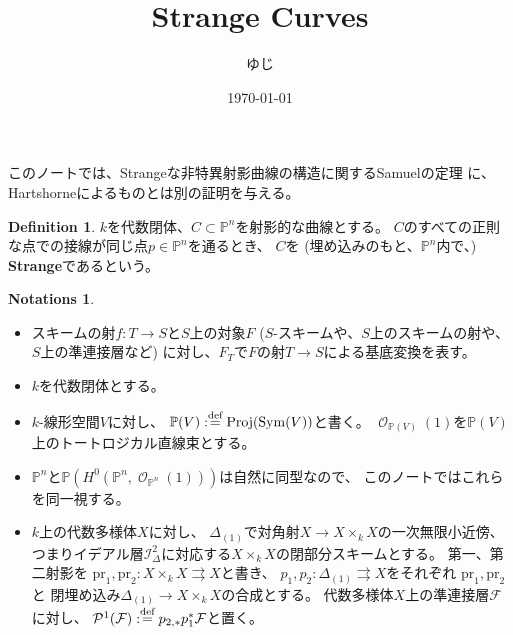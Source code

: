 \documentclass[uplatex]{jsarticle}
\title{Strange Curves}
\author{ゆじ}
\date{\today}
\theoremstyle{definition}
\newtheorem{defi}[defi]{Definition}
\newtheorem*{notation*}{Notations}
\DeclareMathOperator{\Proj}{\mathrm{Proj}}
\DeclareMathOperator{\Sym}{\mathrm{Sym}}
\renewcommand{\P}{\mathbb{P}}
\newcommand{\mcF}{\mathcal{F}}
\newcommand{\mcI}{\mathcal{I}}
\newcommand{\mcO}{\mathcal{O}}
\newcommand{\mcP}{\mathcal{P}}
\DeclareMathOperator{\OOO}{\mcO}
\newcommand{\OO}[1]{\OOO_{#1}}
\def\dfn{:\overset{\mbox{{\scriptsize def}}}{=}}
\begin{document}
\maketitle


このノートでは、Strangeな非特異射影曲線の構造に関するSamuelの定理
\cite[定理 IV.3.9]{Ha}に、Hartshorneによるものとは別の証明を与える。

\begin{defi}
  \(k\)を代数閉体、\(C\subset \P^n\)を射影的な曲線とする。
  \(C\)のすべての正則な点での接線が同じ点\(p\in \P^n\)を通るとき、
  \(C\)を (埋め込みのもと、\(\P^n\)内で、) \textbf{Strange}であるという。
\end{defi}


\begin{notation*}
  \
  \begin{itemize}
    \item
    スキームの射\(f:T\to S\)と\(S\)上の対象\(F\)
    (\(S\)-スキームや、\(S\)上のスキームの射や、\(S\)上の準連接層など)
    に対し、\(F_T\)で\(F\)の射\(T\to S\)による基底変換を表す。
    \item
    \(k\)を代数閉体とする。
    \item
    \(k\)-線形空間\(V\)に対し、
    \(\P(V) \dfn \Proj(\Sym(V))\)と書く。
    \(\OO{\P(V)}(1)\)を\(\P(V)\)上のトートロジカル直線束とする。
    \item
    \(\P^n\)と\(\P(H^0(\P^n,\OO{\P^n}(1)))\)は自然に同型なので、
    このノートではこれらを同一視する。
    \item
    \(k\)上の代数多様体\(X\)に対し、
    \(\Delta_{(1)}\)で対角射\(X\to X\times_kX\)の一次無限小近傍、
    つまりイデアル層\(\mcI_{\Delta}^2\)に対応する\(X\times_kX\)の閉部分スキームとする。
    第一、第二射影を
    \(\mathrm{pr}_1,\mathrm{pr}_2:X\times_kX\rightrightarrows X\)と書き、
    \(p_1,p_2:\Delta_{(1)}\rightrightarrows X\)をそれぞれ
    \(\mathrm{pr}_1,\mathrm{pr}_2\)と
    閉埋め込み\(\Delta_{(1)}\to X\times_kX\)の合成とする。
    代数多様体\(X\)上の準連接層\(\mcF\)に対し、
    \(\mcP^1(\mcF)\dfn p_{2,*}p_1^*\mcF\)と置く。
  \end{itemize}
\end{notation*}
\end{document}
